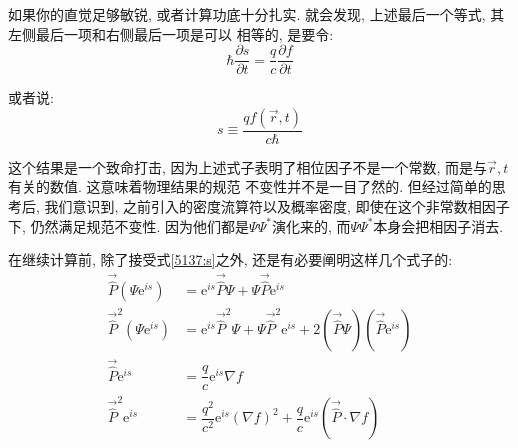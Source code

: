 \documentclass[a4paper, 11pt]{article}
\begin{document}
\begin{spacing}{1.2}
        如果你的直觉足够敏锐, 或者计算功底十分扎实. 就会发现, 上述最后一个等式, 其左侧最后一项和右侧最后一项是可以
        相等的, 是要令:
        \begin{equation}
          \hbar\dfrac{\partial{}s}{\partial{}t} = \dfrac{q}{c}\dfrac{\partial{}f}{\partial{}t}
        \end{equation}

        或者说:
        \begin{equation}
          \label{5137:s}
          s \equiv \dfrac{qf(\vec{r},t)}{c\hbar}
        \end{equation}

        这个结果是一个致命打击, 因为上述式子表明了相位因子不是一个常数, 而是与$\vec{r},t$有关的数值. 这意味着物理结果的规范
        不变性并不是一目了然的. 但经过简单的思考后, 我们意识到, 之前引入的密度流算符以及概率密度, 即使在这个非常数相因子下, 
        仍然满足规范不变性. 
        因为他们都是$\Psi\Psi^*$演化来的, 而$\Psi\Psi^*$本身会把相因子消去. 

        在继续计算前, 除了接受式\eqref{5137:s}之外, 还是有必要阐明这样几个式子的:
        \begin{equation}
          \begin{aligned}
            \vec{\hat{P}}\left(\Psi\mathrm{e}^{is}\right) &= \mathrm{e}^{is}\vec{\hat{P}}\Psi+\Psi\vec{\hat{P}}\mathrm{e}^{is}\\
            \vec{\hat{P}}^2\left(\Psi\mathrm{e}^{is}\right) &= \mathrm{e}^{is}\vec{\hat{P}}^2\Psi+\Psi\vec{\hat{P}}^2\mathrm{e}^{is}+2\left(\vec{\hat{P}}\Psi\right)\left(\vec{\hat{P}}\mathrm{e}^{is}\right)\\
            \vec{\hat{P}}\mathrm{e}^{is} &= \dfrac{q}{c}\mathrm{e}^{is}\nabla{}f\\
            \vec{\hat{P}}^2\mathrm{e}^{is} &= \dfrac{q^2}{c^2}\mathrm{e}^{is}(\nabla{}f)^2 + \dfrac{q}{c}\mathrm{e}^{is}\left(\vec{\hat{P}}\cdot\nabla{}f\right)
          \end{aligned}
        \end{equation}
        

\end{spacing}
\end{document}
